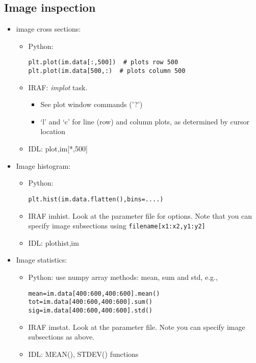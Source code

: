 \documentclass{article}
\begin{document}
\subsection*{Image inspection}
\begin{itemize}
\item image cross sections:
    \begin{itemize}
        \item Python:
            \begin{verbatim}
plt.plot(im.data[:,500])  # plots row 500
plt.plot(im.data[500,:)  # plots column 500
            \end{verbatim}
        \item IRAF: \emph{implot} task.
            \begin{itemize}
                \item See plot window commands ('?')
                \item `l' and `c' for line (row) and column plots,
                    as determined by cursor location
            \end{itemize}
        \item IDL: plot,im[*,500]
    \end{itemize}

\item Image histogram:
    \begin{itemize}
        \item Python:
            \begin{verbatim}
plt.hist(im.data.flatten(),bins=....)
            \end{verbatim}
        \item IRAF imhist. Look at the parameter file for options. Note that you
            can specify image subsections using
            \texttt{filename[x1:x2,y1:y2]}
        \item IDL: plothist,im
    \end{itemize}

\item Image statistics:
    \begin{itemize}
        \item Python: use numpy array methods: mean, sum and std, e.g.,
            \begin{verbatim}
mean=im.data[400:600,400:600].mean()
tot=im.data[400:600,400:600].sum()
sig=im.data[400:600,400:600].std()
            \end{verbatim}
        \item IRAF imstat. Look at the parameter file. Note you can specify
            image subsections as above.
        \item IDL: MEAN(), STDEV() functions
\end{itemize}


\end{itemize}
\end{document}
